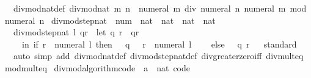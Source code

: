\begin{isabellebody}
\ \ divmod{\isacharprime}{\kern0pt}{\isacharunderscore}{\kern0pt}nat{\isacharunderscore}{\kern0pt}def{\isacharcolon}{\kern0pt}\ {\isachardoublequoteopen}divmod{\isacharunderscore}{\kern0pt}nat\ m\ n\ {\isacharequal}{\kern0pt}\ {\isacharparenleft}{\kern0pt}numeral\ m\ div\ numeral\ n{\isacharcomma}{\kern0pt}\ numeral\ m\ mod\ numeral\ n{\isacharparenright}{\kern0pt}{\isachardoublequoteclose}\isanewline
\isanewline
{}\isamarkupfalse%
\ divmod{\isacharunderscore}{\kern0pt}step{\isacharunderscore}{\kern0pt}nat\ {\isacharcolon}{\kern0pt}{\isacharcolon}{\kern0pt}\ {\isachardoublequoteopen}num\ {\isasymRightarrow}\ nat\ {\isasymtimes}\ nat\ {\isasymRightarrow}\ nat\ {\isasymtimes}\ nat{\isachardoublequoteclose}\isanewline
{}\isanewline
\ \ {\isachardoublequoteopen}divmod{\isacharunderscore}{\kern0pt}step{\isacharunderscore}{\kern0pt}nat\ l\ qr\ {\isacharequal}{\kern0pt}\ {\isacharparenleft}{\kern0pt}let\ {\isacharparenleft}{\kern0pt}q{\isacharcomma}{\kern0pt}\ r{\isacharparenright}{\kern0pt}\ {\isacharequal}{\kern0pt}\ qr\isanewline
\ \ \ \ in\ if\ r\ {\isasymge}\ numeral\ l\ then\ {\isacharparenleft}{\kern0pt}{}\ {\isacharasterisk}{\kern0pt}\ q\ {\isacharplus}{\kern0pt}\ {}{\isacharcomma}{\kern0pt}\ r\ {\isacharminus}{\kern0pt}\ numeral\ l{\isacharparenright}{\kern0pt}\isanewline
\ \ \ \ else\ {\isacharparenleft}{\kern0pt}{}\ {\isacharasterisk}{\kern0pt}\ q{\isacharcomma}{\kern0pt}\ r{\isacharparenright}{\kern0pt}{\isacharparenright}{\kern0pt}{\isachardoublequoteclose}\isanewline
\isanewline
{}\isamarkupfalse%
%
\isadelimproof
\ %
\endisadelimproof
%
\isatagproof
{}\isamarkupfalse%
\ standard\isanewline
\ \ {\isacharparenleft}{\kern0pt}auto\ simp\ add{\isacharcolon}{\kern0pt}\ divmod{\isacharprime}{\kern0pt}{\isacharunderscore}{\kern0pt}nat{\isacharunderscore}{\kern0pt}def\ divmod{\isacharunderscore}{\kern0pt}step{\isacharunderscore}{\kern0pt}nat{\isacharunderscore}{\kern0pt}def\ div{\isacharunderscore}{\kern0pt}greater{\isacharunderscore}{\kern0pt}zero{\isacharunderscore}{\kern0pt}iff\ div{\isacharunderscore}{\kern0pt}mult{}{\isacharunderscore}{\kern0pt}eq\ mod{\isacharunderscore}{\kern0pt}mult{}{\isacharunderscore}{\kern0pt}eq{\isacharparenright}{\kern0pt}%
\endisatagproof
{\isafoldproof}%
%
\isadelimproof
%
\endisadelimproof
\isanewline
\isanewline
{}\isamarkupfalse%
\isanewline
\isanewline
{}\isamarkupfalse%
\ divmod{\isacharunderscore}{\kern0pt}algorithm{\isacharunderscore}{\kern0pt}code\ {\isacharbrackleft}{\kern0pt}\ {\isacharquery}{\kern0pt}{\isacharprime}{\kern0pt}a\ {\isacharequal}{\kern0pt}\ nat{\isacharcomma}{\kern0pt}\ code{\isacharbrackright}{\kern0pt}\isanewline

\end{isabellebody}

